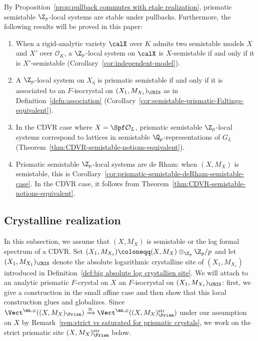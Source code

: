 \begin{rem} \label{rem:first-properties-of-prismatic-semistability}
By Proposition~\ref{prop:pullback commutes with etale realization}, prismatic semistable $\Z_p$-local systems are stable under pullbacks. Furthermore, the following results will be proved in this paper: 
\begin{enumerate}
\item When a rigid-analytic variety $\calX$ over $K$ admits two semistable models $X$ and $X'$ over $\mathcal{O}_K$, a $\Z_p$-local system on $\calX$ is $X$-semistable if and only if it is $X'$-semistable (Corollary~\ref{cor:independent-model}).
\item A $\Z_p$-local system on $X_{\eta}$ is prismatic semistable if and only if it is associated to an $F$-isocrystal on $(X_1, M_{X_1})_{\CRIS}$ as in Definition~\ref{defn:association} (Corollary~\ref{cor:semistable-prismatic-Faltings-equivalent}).
\item In the CDVR case where $X=\Spf \mathcal{O}_L$, prismatic semistable $\Z_p$-local systems correspond to lattices in semistable $\Q_p$-representations of $G_L$ (Theorem~\ref{thm:CDVR-semistable-notions-equivalent}).
\item Prismatic semistable $\Z_p$-local systems are de Rham: when $(X, M_X)$ is semistable, this is Corollary~\ref{cor:prismatic-semistable-deRham-semistable-case}. In the CDVR case, it follows from Theorem~\ref{thm:CDVR-semistable-notions-equivalent}. 
\end{enumerate}
\end{rem}



\subsection{Crystalline realization}\label{sec:crystallinerealization}

In this subsection, we assume that $(X, M_X)$ is semistable or the log formal spectrum of a CDVR. Set $(X_1,M_{X_1})\coloneqq (X,M_X)\otimes_{\Z_p}\Z_p/p$ and let $(X_1,M_{X_1})_\CRIS$ denote the absolute logarithmic crystalline site of $(X_1,M_{X_1})$ introduced in Definition~\ref{def:big absolute log crystallien site}. We will attach to an analytic prismatic $F$-crystal on $X$ an $F$-isocrystal on $(X_1,M_{X_1})_\CRIS$: first, we give a construction in the small affine case and then show that this local construction glues and globalizes. Since $\Vect^{\an,\varphi}((X,M_X)_\Prism)\xrightarrow{\cong}\Vect^{\an,\varphi}((X,M_X)_\Prism^\mathrm{str})$ under our assumption on $X$ by Remark~\ref{rem:strict vs saturated for prismatic crystals}, we work on the strict prismatic site $(X,M_X)_\Prism^\mathrm{str}$ below.

